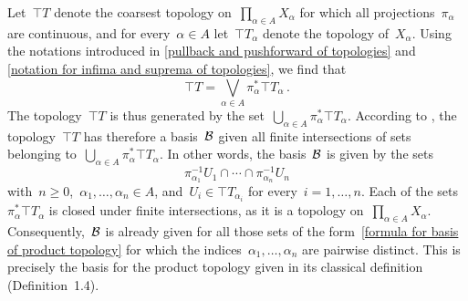 Let~$\top{T}$ denote the coarsest topology on~$∏_{α ∈ A} X_α$ for which all projections~$π_α$ are continuous, and for every~$α ∈ A$ let~$\top{T}_α$ denote the topology of~$X_α$.
Using the notations introduced in \cref{pullback and pushforward of topologies} and \cref{notation for infima and suprema of topologies}, we find that
\[
	\top{T} = ⋁_{α ∈ A} π_α^* \top{T}_α \,.
\]
The topology~$\top{T}$ is thus generated by the set~$⋃_{α ∈ A} π_α^* \top{T}_α$.
According to , the topology~$\top{T}$ has therefore a basis~$\mathcal{B}$ given all finite intersections of sets belonging to~$⋃_{α ∈ A} π_α^* \top{T}_α$.
In other words, the basis~$\mathcal{B}$ is given by the sets
\begin{equation}
	\label{formula for basis of product topology}
	π_{α_1}^{-1} U_1 ∩ \dotsb ∩ π_{α_n}^{-1} U_n
\end{equation}
with~$n ≥ 0$,~$α_1, \dotsc, α_n ∈ A$, and~$U_i ∈ \top{T}_{α_i}$ for every~$i = 1, \dotsc, n$.
Each of the sets~$π_α^* \top{T}_α$ is closed under finite intersections, as it is a topology on~$∏_{α ∈ A} X_α$.
Consequently,~$\mathcal{B}$ is already given for all those sets of the form~\eqref{formula for basis of product topology} for which the indices~$α_1, \dotsc, α_n$ are pairwise distinct.
This is precisely the basis for the product topology given in its classical definition (Definition~1.4).
